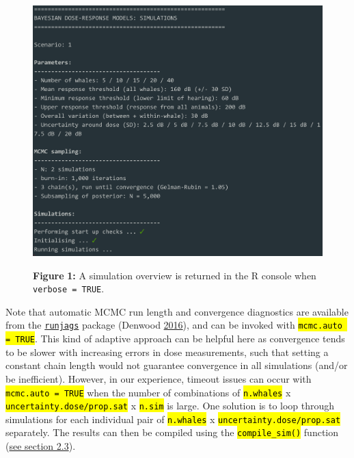 \documentclass[
]{article}
\begin{document}
\begin{figure}

{\centering \includegraphics[width=0.7\linewidth]{fig/fig_console_output} 

}

\textbf{Figure }{\textbf{1:} \hypertarget{fig1}{}A simulation overview is returned in the R console when \texttt{verbose\ =\ TRUE}.}\label{fig:fig1}
\end{figure}

Note that automatic MCMC run length and convergence diagnostics are available from the \href{https://cran.r-project.org/web/packages/runjags/index.html}{\texttt{runjags}} package (Denwood \protect\hyperlink{ref-Denwood2016}{2016}), and can be invoked with \textcolor{codecolor}{\texttt{\hl{mcmc.auto = TRUE}}}. This kind of adaptive approach can be helpful here as convergence tends to be slower with increasing errors in dose measurements, such that setting a constant chain length would not guarantee convergence in all simulations (and/or be inefficient). However, in our experience, timeout issues can occur with \textcolor{codecolor}{\texttt{\hl{mcmc.auto = TRUE}}} when the number of combinations of \textcolor{codecolor}{\texttt{\hl{n.whales}}} x \textcolor{codecolor}{\texttt{\hl{uncertainty.dose/prop.sat}}} x \textcolor{codecolor}{\texttt{\hl{n.sim}}} is large. One solution is to loop through simulations for each individual pair of \textcolor{codecolor}{\texttt{\hl{n.whales}}} x \textcolor{codecolor}{\texttt{\hl{uncertainty.dose/prop.sat}}} separately. The results can then be compiled using the \textcolor{codecolor}{\texttt{\hl{compile\_sim()}}} function (\hyperlink{compilelink}{see section 2.3}).
\end{document}
